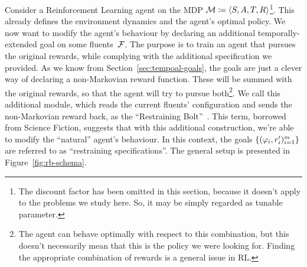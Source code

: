 Consider a Reinforcement Learning agent on the MDP $\mathcal{M} \coloneqq \langle
S, A, T, R \rangle$\footnote{
	The discount factor has been omitted in this section, because it doesn't
	apply to the problems we study here. So, it may be simply regarded as
	tunable parameter.
}.
This already defines the environment dynamics and the agent's optimal policy.
We now want to modify the agent's behaviour by declaring an additional
temporally-extended goal on some fluents~$\mathcal{F}$.  The purpose is to train
an agent that pursues the original rewards, while complying with the
additional specification we provided.  As we know from
Section~\ref{sec:tempoal-goals}, the \ldl{} goals are just a clever way of
declaring a non-Markovian reward function. These will be summed with the
original rewards, so that the agent will try to pursue both\footnote{
	The agent can behave optimally with respect to this combination, but this
	doesn't necessarily mean that this is the policy we were looking for.
	Finding the appropriate combination of rewards is a general issue in RL.
}.
We call this additional module, which reads the current fluents' configuration
and sends the non-Markovian reward back, as the ``Restraining
Bolt''~\cite{bib:bolt}. This term, borrowed from Science Fiction, suggests
that with this additional construction, we're able to modify the ``natural''
agent's behaviour. In this context, the \ldl{} goals $\{(\varphi_i,
r_i')_{i=1}^m\}$ are referred to as ``restraining specifications''. The general
setup is presented in Figure~\ref{fig:rb-schema}.
